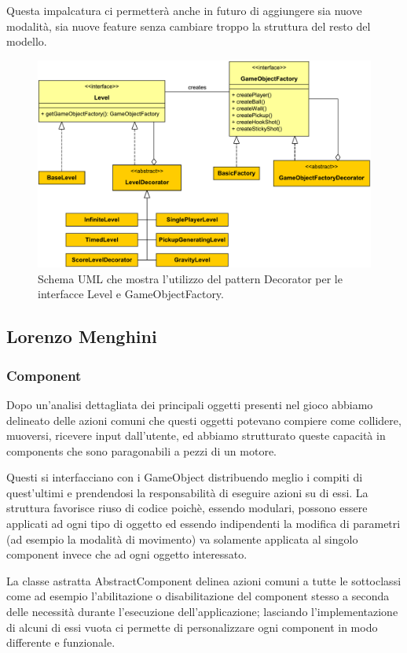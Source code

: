 \documentclass[a4paper,12pt]{report}
\begin{document}
Questa impalcatura ci permetterà anche in futuro di aggiungere sia nuove modalità, sia nuove feature senza cambiare troppo la struttura del resto del modello.

\begin{figure}[H]
\includegraphics[width=\linewidth]{img/decorator}
\caption{Schema UML che mostra l'utilizzo del pattern Decorator per le interfacce Level e GameObjectFactory.}
\label{img:decorator}
\end{figure}

\subsection*{Lorenzo Menghini}

\subsubsection*{Component}

Dopo un'analisi dettagliata dei principali oggetti presenti nel gioco abbiamo delineato delle azioni comuni che questi oggetti potevano compiere come collidere, muoversi, ricevere input dall'utente, ed abbiamo strutturato queste capacità in components che sono paragonabili a pezzi di un motore.

Questi si interfacciano con i GameObject distribuendo meglio i compiti di quest'ultimi e prendendosi la responsabilità di eseguire azioni su di essi.
La struttura favorisce riuso di codice poichè, essendo modulari, possono essere applicati ad ogni tipo di oggetto ed essendo indipendenti la modifica di parametri (ad esempio la modalità di movimento) va solamente applicata al singolo component invece che ad ogni oggetto interessato.

La classe astratta AbstractComponent delinea azioni comuni a tutte le sottoclassi come ad esempio l'abilitazione o disabilitazione del component stesso a seconda delle necessità durante l'esecuzione dell'applicazione; lasciando l'implementazione di alcuni di essi vuota ci permette di personalizzare ogni component in modo differente e funzionale.
\end{document}
